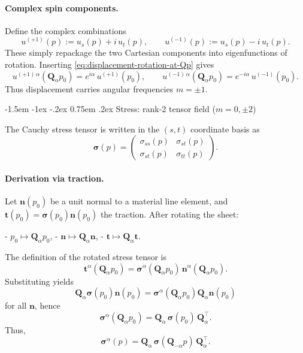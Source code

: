 \documentclass[12pt]{article}
\makeatletter
\renewcommand\subsection{\@startsection{subsection}{2}{\z@}%
                                     {-1.5em \@plus -1ex \@minus -.2ex}%
                                     {0.75em \@plus .2ex}%
                                     {\normalfont\large\bfseries}}
\makeatother
\begin{document}
\paragraph{Complex spin components.}
Define the complex combinations
\begin{equation}
  u^{(+1)}(p) := u_s(p) + i\,u_t(p),
  \qquad
  u^{(-1)}(p) := u_s(p) - i\,u_t(p).
\end{equation}
These simply repackage the two Cartesian components into
eigenfunctions of rotation. Inserting
\eqref{eq:displacement-rotation-at-Qp} gives
\[
  u^{(+1)\,\alpha}(\mathbf{Q}_\alpha p_0)
  = e^{i\alpha}\,u^{(+1)}(p_0),
\qquad
  u^{(-1)\,\alpha}(\mathbf{Q}_\alpha p_0)
  = e^{-i\alpha}\,u^{(-1)}(p_0).
\]
Thus displacement carries angular frequencies $m=\pm1$.

\subsection{Stress: rank-2 tensor field (\texorpdfstring{$m=0,\pm2$}{m=0, })}

The Cauchy stress tensor is written in the $(s,t)$ coordinate basis as
\[
  \boldsymbol{\sigma}(p)
  =
  \begin{pmatrix}
    \sigma_{ss}(p) & \sigma_{st}(p) \\
    \sigma_{st}(p) & \sigma_{tt}(p)
  \end{pmatrix}.
\]

\paragraph{Derivation via traction.}
Let $\mathbf{n}(p_0)$ be a unit normal to a material line element, and
$\mathbf{t}(p_0)=\boldsymbol{\sigma}(p_0)\mathbf{n}(p_0)$ the traction.
After rotating the sheet:

- $p_0\mapsto \mathbf{Q}_\alpha p_0$,
- $\mathbf{n}\mapsto \mathbf{Q}_\alpha\mathbf{n}$,
- $\mathbf{t}\mapsto \mathbf{Q}_\alpha\mathbf{t}$.

The definition of the rotated stress tensor is  
\[
  \mathbf{t}^\alpha(\mathbf{Q}_\alpha p_0)
  = \boldsymbol{\sigma}^\alpha(\mathbf{Q}_\alpha p_0)\,
    \mathbf{n}^\alpha(\mathbf{Q}_\alpha p_0).
\]
Substituting yields
\[
  \mathbf{Q}_\alpha \boldsymbol{\sigma}(p_0)\mathbf{n}(p_0)
  =
  \boldsymbol{\sigma}^\alpha(\mathbf{Q}_\alpha p_0)
  \mathbf{Q}_\alpha\mathbf{n}(p_0)
\]
for all $\mathbf{n}$, hence
\begin{equation}
  \label{eq:stress-rotation-at-Qp}
  \boldsymbol{\sigma}^\alpha(\mathbf{Q}_\alpha p_0)
  = \mathbf{Q}_\alpha\,\boldsymbol{\sigma}(p_0)\,\mathbf{Q}_\alpha^\top.
\end{equation}
Thus,
\begin{equation}
  \label{eq:stress-rotation}
  \boldsymbol{\sigma}^\alpha(p)
  = \mathbf{Q}_\alpha\,\boldsymbol{\sigma}(\mathbf{Q}_{-\alpha}p)\,
    \mathbf{Q}_\alpha^\top.
\end{equation}
\end{document}

